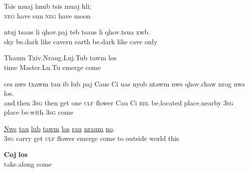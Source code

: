 \documentclass[output=paper]{LSP/langsci}
\begin{document}
\begin{exe}
 \label{JaexApp16}
\gll Tsis muaj hnub tsis muaj hli;\\
 \textsc{neg} have sun \textsc{neg} have moon\\
\glt {}
\end{exe}

\begin{exe}
 \label{JaexApp17}
\gll ntuj tsaus li qhov.paj teb tsaus li qhov.tsua xwb.\\
     sky be.dark like cavern earth be.dark like cave only\\
\glt {}
\end{exe}

\begin{exe}
 \label{JaexApp18}
\gll Thaum Txiv.Nraug.Luj.Tub tawm los\\
     time Master.Lu.Tu emerge come\\
\glt {}
\end{exe}

\begin{exe}
 \label{JaexApp19}
\gll ces nws txawm tau ib lub paj Caus Ci uas nyob ntawm nws qhov.chaw nrog nws los.\\
     and.then \textsc{3sg} then get one \textsc{clf} flower Cau Ci \textsc{rel} be.located place.nearby \textsc{3sg} place be.with \textsc{3sg} come\\
\glt {}
\end{exe}

\begin{exe}
 \label{JaexApp20}
\gll \underline{Nws} \underline{} \underline{tau} \underline{lub} \underline{} \underline{tawm} \underline{los} \underline{rau} \underline{nraum} \underline{} \underline{no}.\\
     \textsc{3sg} carry get \textsc{clf} flower emerge come to outside world this\\
\glt {}
\end{exe}

\begin{exe}
 \label{JaexApp21}
\gll \textbf{Coj} \textbf{los}\\
     take.along come\\
\glt {}
\end{exe}
\end{document}
